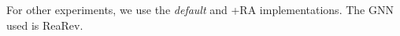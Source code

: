 \begin{table}[tb]
{\begin{threeparttable}
\begin{tabular}{@{}ll|cc|b@{}}
			
			\bottomrule
		\end{tabular}%
        
		\begin{tablenotes}
        \item For other experiments, we use the \textit{default} \grag  and \gragx+RA  implementations. The GNN used is ReaRev.
        \end{tablenotes}
		\end{threeparttable}
}


\end{table}%





             
             
            
			


